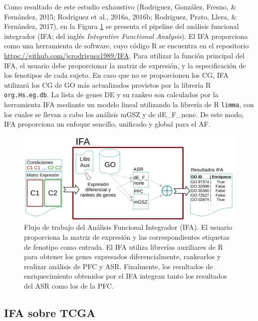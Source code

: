 \documentclass[12pt,twoside]{reedthesis}
\begin{document}
Como resultado de este estudio exhaustivo (Rodriguez, González, Fresno, \& Fernández, 2015; Rodriguez et al., 2016a, 2016b; Rodriguez, Prato, Llera, \& Fernández, 2017), en la Figura \ref{fig:ifa4} se presenta el pipeline del análisis funcional integrador (IFA; del inglés \emph{Integrative Functional Analysis}). El IFA proporciona como una herramienta de software, cuyo código R se encuentra en el repositorio \url{https://github.com/jcrodriguez1989/IFA}. Para utilizar la función principal del IFA, el usuario debe proporcionar la matriz de expresión, y la especificación de los fenotipos de cada sujeto. En caso que no se proporcionen los CG, IFA utilizará los CG de GO más actualizados provistos por la librería R \texttt{org.Hs.eg.db}. La lista de genes DE y su rankeo son calculados por la herramienta IFA mediante un modelo lineal utilizando la librería de R \texttt{limma}, con los cuales se llevan a cabo los análisis mGSZ y de dE\_F\_none. De este modo, IFA proporciona un enfoque sencillo, unificado y global para el AF.
\begin{figure}

{\centering \includegraphics[width=1\linewidth]{images/IFA_FIG4_es} 

}

\caption{Flujo de trabajo del Análisis Funcional Integrador (IFA). El usuario proporciona la matriz de expresión y las correspondientes etiquetas de fenotipo como entrada. El IFA utiliza librerías auxiliares de R para obtener los genes expresados diferencialmente, rankearlos y realizar análisis de PFC y ASR. Finalmente, los resultados de enriquecimiento obtenidos por el IFA integran tanto los resultados del ASR como los de la PFC.}\label{fig:ifa4}
\end{figure}


\hypertarget{ifa-sobre-tcga}{%
\subsection{IFA sobre TCGA}\label{ifa-sobre-tcga}}
\end{document}
